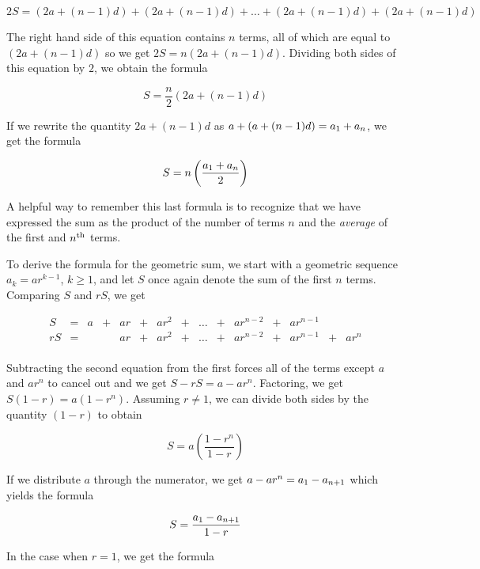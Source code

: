 \[2S = (2a + (n-1)d) + (2a + (n-1)d) + \ldots + (2a + (n-1)d) + (2a + (n-1)d)\]


The right hand side of this equation contains $n$ terms, all of  which are equal to $(2a + (n-1)d)$ so we get $2S = n(2a + (n-1)d)$.  Dividing both sides of this equation by $2$, we obtain the formula

\[S =  \dfrac{n}{2} (2a + (n-1)d)\]

If we rewrite the quantity $2a + (n-1)d$ as $a + (a + (n-1)d) = a_{\mbox{\scriptsize$1$}} + a_{n}$, we get the formula 

\[ S = n \left(\dfrac{a_{\mbox{\scriptsize$1$}} + a_{n}}{2}\right)\]

A helpful way to remember this last formula is to recognize that we have expressed the sum as the product of the number of terms $n$ and the \textit{average} of the first and $n^{\mbox{\scriptsize th}}$ terms.

\smallskip

To derive the formula for the geometric sum, we start with a geometric sequence $a_{k} = ar^{k-1}$, $k \geq 1$, and let $S$ once again denote the sum of the first $n$ terms.  Comparing  $S$ and $rS$, we get

\[ \begin{array}{ccccccccccccccc}

S & = & a & + & ar &  + & ar^2 & + & \ldots & + & ar^{n-2} & + & ar^{n-1} & & \\ 

r S & = & & & ar & + & ar^2 & + & \ldots &  + & ar^{n-2} & + & ar^{n-1} & + & ar^{n}  \\

\end{array}\]

Subtracting the second equation from the first forces all of the terms except $a$ and $ar^{n}$ to cancel out and we get $S - rS = a - ar^{n}$.  Factoring, we get $S(1-r) = a \left(1-r^{n}\right)$.  Assuming $r \neq 1$, we can divide both sides by  the quantity $(1-r)$ to obtain

\[S =  a \left( \dfrac{1-r^n}{1-r}\right)\]

If we distribute $a$ through the numerator, we get $a - ar^{n} = a_{\mbox{\scriptsize$1$}} - a_{n\mbox{\scriptsize$ + 1$}}$ which yields the formula

\[S =  \dfrac{a_{\mbox{\scriptsize$1$}}-a_{n\mbox{\scriptsize$ + 1$}}}{1-r}\]

In the case when $r=1$, we get the formula

